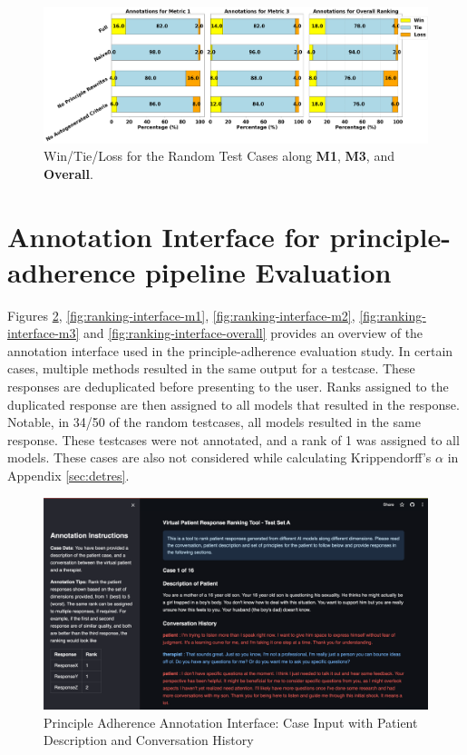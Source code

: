 \documentclass[11pt]{article}
\begin{document}
\begin{figure} [ht]
    \centering
    \includegraphics[width=\textwidth]{figures/random.png}
    \caption{Win/Tie/Loss for the Random Test Cases along \textbf{M1}, \textbf{M3}, and \textbf{Overall}.}
    \label{fig:wtl-error2}
\end{figure}

\section{Annotation Interface for principle-adherence pipeline Evaluation}
\label{sec:annotint}

Figures \ref{fig:ranking-interface-caseinput}, \ref{fig:ranking-interface-m1}, \ref{fig:ranking-interface-m2}, \ref{fig:ranking-interface-m3} and \ref{fig:ranking-interface-overall} provides an overview of the annotation interface used in the principle-adherence evaluation study. In certain cases, multiple methods resulted in the same output for a testcase. These responses are deduplicated before presenting to the user. Ranks assigned to the duplicated response are then assigned to all models that resulted in the response. Notable, in 34/50 of the random testcases, all models resulted in the same response. These testcases were not annotated, and a rank of 1 was assigned to all models. These cases are also not considered while calculating Krippendorff's $\alpha$ in Appendix \ref{sec:detres}.

\begin{figure}
    \centering
    \includegraphics[width=\textwidth]{Study Screenshots/response-ranking-annotation-interface/caseinput.png}
    \caption{Principle Adherence Annotation Interface: Case Input with Patient Description and Conversation History}
    \label{fig:ranking-interface-caseinput}
\end{figure}
\end{document}
